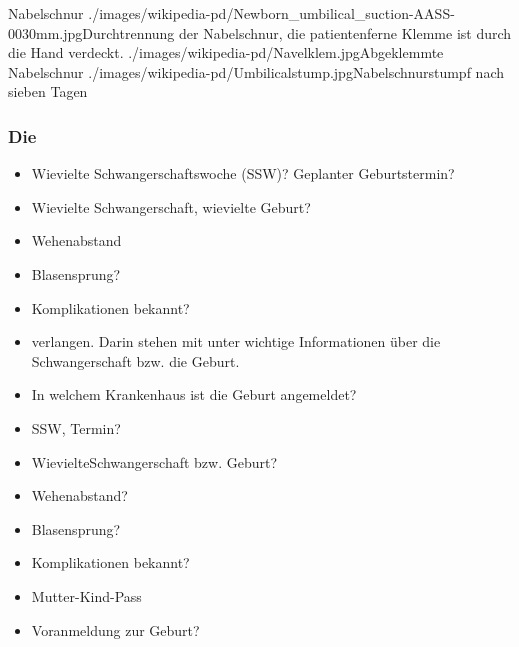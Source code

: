 

\begin{PictureSeriesWide}{}{Nabelschnur}
{./images/wikipedia-pd/Newborn_umbilical_suction-AASS-0030mm.jpg}{Durchtrennung der Nabelschnur, die patientenferne Klemme ist durch die Hand verdeckt. }
{./images/wikipedia-pd/Navelklem.jpg}{Abgeklemmte Nabelschnur }
{./images/wikipedia-pd/Umbilicalstump.jpg}{Nabelschnurstumpf nach sieben Tagen }
{}{}
\end{PictureSeriesWide}





\subsubsection{Die }


{%
\begin{itemize}
  \item Wievielte Schwangerschaftswoche
  (SSW)? Geplanter Geburtstermin?
  \item Wievielte Schwangerschaft,
  wievielte Geburt? 
  \item Wehenabstand
  \item Blasensprung? 
  \item Komplikationen bekannt?
  \item {} verlangen. Darin stehen mit
  unter wichtige Informationen über die Schwangerschaft bzw. die  Geburt.
  \item In welchem Krankenhaus ist die Geburt
  angemeldet?
\end{itemize}
}{
\begin{itemize}
  \item SSW, Termin?
  \item WievielteSchwangerschaft bzw. Geburt?
  \item Wehenabstand?
  \item Blasensprung?
  \item Komplikationen bekannt?
  \item Mutter-Kind-Pass
  \item Voranmeldung zur Geburt?
\end{itemize}
}{}{}{}
  
